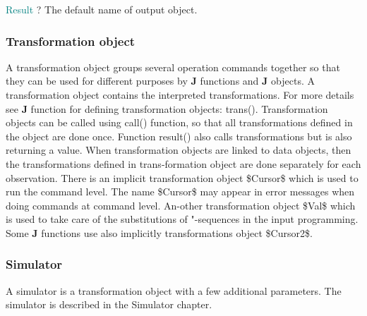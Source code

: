 \noindent \textcolor{teal}{Result} \tabto{25mm }   ?  \tabto{45mm }   The default name of output object.

\subsubsection{Transformation object}
\label{transo}
A transformation object groups several operation commands together so that they
can be used for different purposes by \textbf{J} functions and \textbf{J} objects. A
transformation object contains the interpreted transformations. For more details
see \textbf{J} function for defining transformation objects: \textcolor{VioletRed}{trans}().
Transformation objects can be called using \textcolor{VioletRed}{call}() function, so that all
transformations defined in the object are done once. Function result() also calls
transformations but is also returning a value. When transformation objects are
linked to data objects, then the transformations defined in trans-formation object
are done separately for each observation.
There is an implicit transformation object \$Cursor\$ which is used to run the
command level. The name \$Cursor\$ may appear in error messages when doing
commands at command level.  An-other transformation object \$Val\$ which is used to
take care of the substitutions of "-sequences in the input programming. Some \textbf{J}
functions use also implicitly transformations object \$Cursor2\$.
\subsubsection{Simulator}
\label{simulatoro}
A simulator is a transformation object with a few additional parameters. The
simulator is described in the Simulator chapter.
